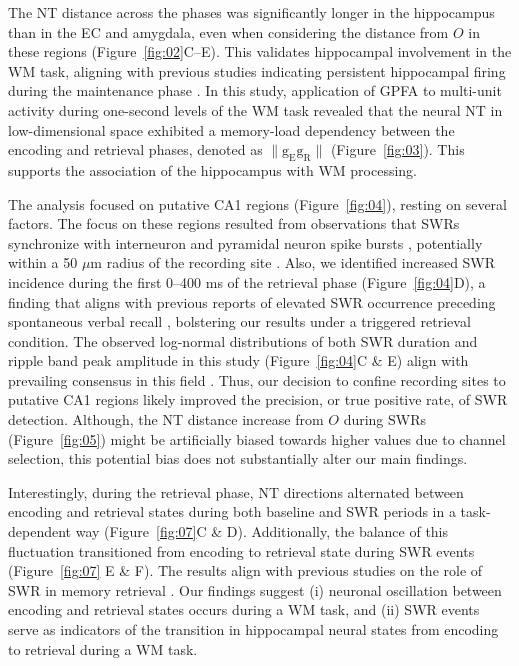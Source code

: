 \documentclass[final,3p,times,twocolumn]{elsarticle}
\begin{document}
The NT distance across the phases was significantly longer in the hippocampus than in the EC and amygdala, even when considering the distance from $O$ in these regions (Figure~\ref{fig:02}C--E). This validates hippocampal involvement in the WM task, aligning with previous studies indicating persistent hippocampal firing during the maintenance phase \cite{boran_persistent_2019} \cite{kaminski_persistently_2017} \cite{kornblith_persistent_2017} \cite{faraut_dataset_2018}. In this study, application of GPFA to multi-unit activity during one-second levels of the WM task revealed that the neural NT in low-dimensional space exhibited a memory-load dependency between the encoding and retrieval phases, denoted as $\mathrm{\lVert g_{E}g_{R} \rVert}$ (Figure~\ref{fig:03}). This supports the association of the hippocampus with WM processing.

The analysis focused on putative CA1 regions (Figure~\ref{fig:04}), resting on several factors. The focus on these regions resulted from observations that SWRs synchronize with interneuron and pyramidal neuron spike bursts \cite{buzsaki_two-stage_1989} \cite{quyen_cell_2008} \cite{royer_control_2012} \cite{hajos_input-output_2013}, potentially within a 50 $\mu$m radius of the recording site \cite{schomburg_spiking_2012}. Also, we identified increased SWR incidence during the first 0--400 ms of the retrieval phase (Figure~\ref{fig:04}D), a finding that aligns with previous reports of elevated SWR occurrence preceding spontaneous verbal recall \cite{norman_hippocampal_2019} \cite{norman_hippocampal_2021}, bolstering our results under a triggered retrieval condition. The observed log-normal distributions of both SWR duration and ripple band peak amplitude in this study (Figure~\ref{fig:04}C \& E) align with prevailing consensus in this field \cite{liu_consensus_2022}. Thus, our decision to confine recording sites to putative CA1 regions likely improved the precision, or true positive rate, of SWR detection. Although, the NT distance increase from $O$ during SWRs (Figure~\ref{fig:05}) might be artificially biased towards higher values due to channel selection, this potential bias does not substantially alter our main findings.

Interestingly, during the retrieval phase, NT directions alternated between encoding and retrieval states during both baseline and SWR periods in a task-dependent way (Figure~\ref{fig:07}C \& D). Additionally, the balance of this fluctuation transitioned from encoding to retrieval state during SWR events (Figure~\ref{fig:07} E \& F). The results align with previous studies on the role of SWR in memory retrieval \cite{norman_hippocampal_2019} \cite{norman_hippocampal_2021}. Our findings suggest (i) neuronal oscillation between encoding and retrieval states occurs during a WM task, and (ii) SWR events serve as indicators of the transition in hippocampal neural states from encoding to retrieval during a WM task.
\end{document}

